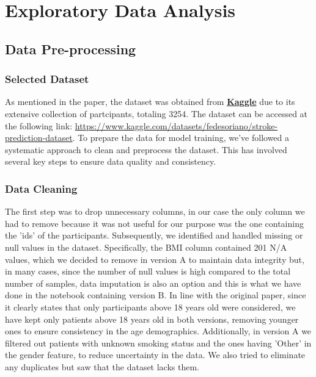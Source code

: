 \documentclass{Configuration_Files/Template}
\begin{document}
\section{Exploratory Data Analysis}

\subsection{Data Pre-processing}

\subsubsection{Selected Dataset}

As mentioned in the paper, the dataset was obtained from \textbf{\href{https://www.kaggle.com/datasets/fedesoriano/stroke-prediction-dataset}{Kaggle}} due to its extensive collection of partcipants, totaling 3254. The dataset can be accessed at the following link: \url{https://www.kaggle.com/datasets/fedesoriano/stroke-prediction-dataset}.
To prepare the data for model training, we've followed a systematic approach to clean and preprocess the dataset. This has involved several key steps to ensure data quality and consistency.

\subsubsection{Data Cleaning}

The first step was to drop unnecessary columns, in our case the only column we had to remove because it was not useful for our purpose was the one containing the 'ids' of the participants.
Subsequently, we identified and handled missing or null values in the dataset. Specifically, the BMI column contained 201 N/A values, which we decided to remove in version A to maintain data integrity but, in many cases, since the number of null values is high compared to the total number of samples, data imputation is also an option and this is what we have done in the notebook containing version B. In line with the original paper, since it clearly states that only participants above 18 years old were considered, we have kept only patients above 18 years old in both versions, removing younger ones to ensure consistency in the age demographics. Additionally, in version A we filtered out patients with unknown smoking status and the ones having 'Other' in the gender feature, to reduce uncertainty in the data.
We also tried to eliminate any duplicates but saw that the dataset lacks them.
\end{document}
